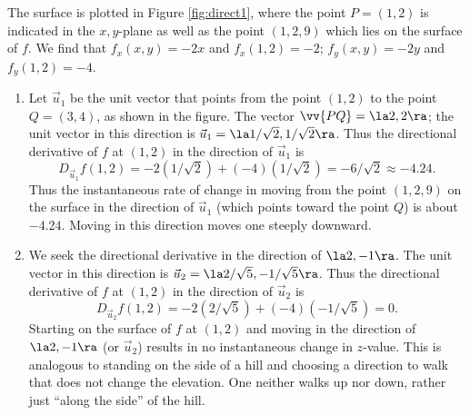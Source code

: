 {
The surface is plotted in Figure \ref{fig:direct1}, where the point $P=(1,2)$ is indicated in the $x,y$-plane as well as the point $(1,2,9)$ which lies on the surface of $f$. We find that $f_x(x,y) = -2x$ and $f_x(1,2) = -2$; $f_y(x,y) = -2y$ and $f_y(1,2) = -4$. 
\begin{enumerate}
	\item Let $\vec u_1$ be the unit vector that points from the point $(1,2)$ to the point $Q=(3,4)$, as shown in the figure. The vector $\vv{PQ} = \la 2,2\ra$; the unit vector in this direction is $\vec u_1=\la 1/\sqrt{2}, 1/\sqrt{2}\ra$. Thus the directional derivative of $f$ at $(1,2)$ in the direction of $\vec u_1$ is
	\[
	D_{\vec u_1}f(1,2) = -2(1/\sqrt{2}) +(-4)(1/\sqrt{2}) = -6/\sqrt{2}\approx -4.24.
	\]
	Thus the instantaneous rate of change in moving from the point $(1,2,9)$ on the surface in the direction of $\vec u_1$ (which points toward the point $Q$) is about $-4.24$. Moving in this direction moves one steeply downward.
	
	\item		We seek the directional derivative in the direction of $\la 2,-1\ra$. The unit vector in this direction is $\vec u_2 = \la 2/\sqrt{5},-1/\sqrt{5}\ra$. Thus the directional derivative of $f$ at $(1,2)$ in the direction of $\vec u_2$ is
	\[
	D_{\vec u_2}f(1,2) = -2(2/\sqrt{5})+(-4)(-1/\sqrt{5}) = 0.
	\]
	Starting on the surface of $f$ at $(1,2)$ and moving in the direction of $\la 2,-1\ra$ (or $\vec u_2$) results in no instantaneous change in $z$-value. This is analogous to standing on the side of a hill and choosing a direction to walk that does not change the elevation. One neither walks up nor down, rather just ``along the side'' of the hill.
	

\end{enumerate}}
